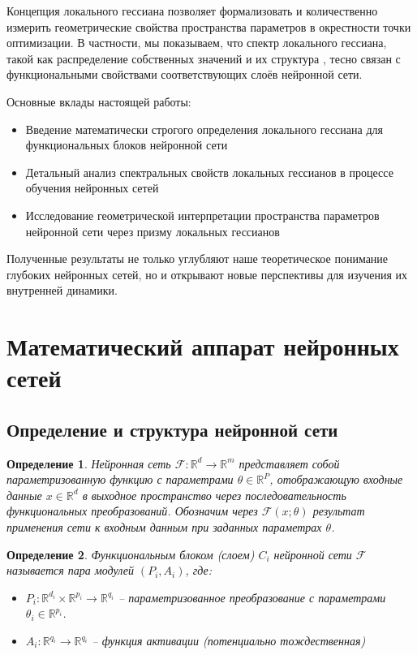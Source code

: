 \documentclass[a4paper,12pt]{article}
\newtheorem{definition}{Определение}
\begin{document}
Концепция локального гессиана позволяет формализовать и количественно измерить геометрические свойства
пространства параметров в окрестности точки оптимизации. В частности, мы показываем, что спектр
локального гессиана, такой как распределение собственных значений и их структура
\cite{ghorbani2019investigation}, тесно связан с функциональными свойствами соответствующих слоёв нейронной сети.

Основные вклады настоящей работы:
\begin{itemize}
  \item Введение математически строгого определения локального гессиана для функциональных блоков нейронной сети
  \item Детальный анализ спектральных свойств локальных гессианов в процессе обучения нейронных сетей
  \item Исследование геометрической интерпретации пространства параметров нейронной сети через призму
    локальных гессианов
\end{itemize}

Полученные результаты не только углубляют наше теоретическое понимание глубоких нейронных сетей, но и
открывают новые перспективы для изучения их внутренней динамики.

\section{Математический аппарат нейронных сетей}

\subsection{Определение и структура нейронной сети}

\begin{definition}
  Нейронная сеть $\mathcal{F}: \mathbb{R}^d \rightarrow \mathbb{R}^m$ представляет собой параметризованную
  функцию с параметрами $\theta \in \mathbb{R}^P$, отображающую входные данные $x \in \mathbb{R}^d$ в
  выходное пространство через последовательность функциональных преобразований. Обозначим через
  $\mathcal{F}(x; \theta)$ результат применения сети к входным данным при заданных параметрах $\theta$.
\end{definition}

\begin{definition}
  Функциональным блоком (слоем) $C_i$ нейронной сети $\mathcal{F}$ называется пара модулей $(P_i, A_i)$, где:
  \begin{itemize}
    \item $P_i: \mathbb{R}^{d_i} \times \mathbb{R}^{p_i} \rightarrow \mathbb{R}^{q_i}$ -- параметризованное
      преобразование с параметрами $\theta_i \in \mathbb{R}^{p_i}$.
    \item $A_i: \mathbb{R}^{q_i} \rightarrow \mathbb{R}^{q_i}$ -- функция активации (потенциально тождественная)
  \end{itemize}
\end{definition}
\end{document}

